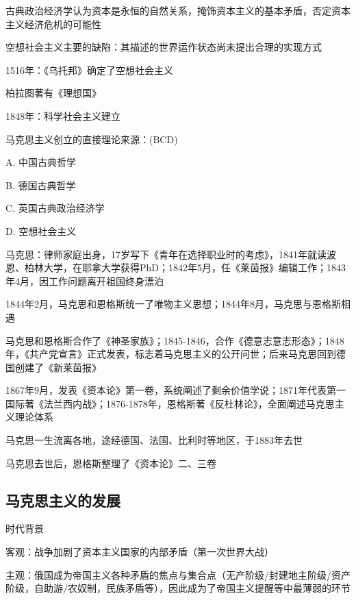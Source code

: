 \begin{notation}
    古典政治经济学认为资本是永恒的自然关系，掩饰资本主义的基本矛盾，否定资本主义经济危机的可能性
\end{notation}
\begin{notation}
    空想社会主义主要的缺陷：其描述的世界运作状态尚未提出合理的实现方式

    1516年：《乌托邦》确定了空想社会主义

    柏拉图著有《理想国》

    1848年：科学社会主义建立
\end{notation}
\begin{eg}
    马克思主义创立的直接理论来源：(BCD)

    A. 中国古典哲学

    B. 德国古典哲学

    C. 英国古典政治经济学

    D. 空想社会主义
\end{eg}
\begin{notation}
    马克思：律师家庭出身，17岁写下《青年在选择职业时的考虑》，1841年就读波恩、柏林大学，在耶拿大学获得PhD；1842年5月，任《莱茵报》编辑工作；1843年4月，因工作问题离开祖国终身漂泊

    1844年2月，马克思和恩格斯统一了唯物主义思想；1844年8月，马克思与恩格斯相遇

    马克思和恩格斯合作了《神圣家族》；1845-1846，合作《德意志意志形态》；1848年，《共产党宣言》正式发表，标志着马克思主义的公开问世；后来马克思回到德国创建了《新莱茵报》

    1867年9月，发表《资本论》第一卷，系统阐述了剩余价值学说；1871年代表第一国际著《法兰西内战》；1876-1878年，恩格斯著《反杜林论》，全面阐述马克思主义理论体系
    
    马克思一生流离各地，途经德国、法国、比利时等地区，于1883年去世

    马克思去世后，恩格斯整理了《资本论》二、三卷
\end{notation}
\subsection{马克思主义的发展}%
\label{sub:马克思主义的发展}
\begin{notation}
    时代背景

    客观：战争加剧了资本主义国家的内部矛盾（第一次世界大战）

    主观：俄国成为帝国主义各种矛盾的焦点与集合点（无产阶级/封建地主阶级/资产阶级，自助游/农奴制，民族矛盾等），因此成为了帝国主义提醒等中最薄弱的环节
\end{notation}

